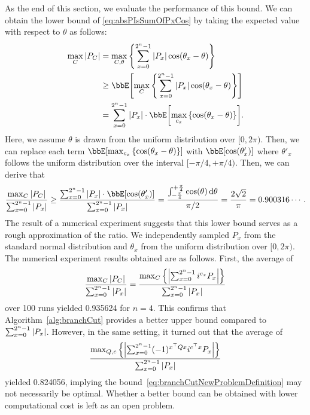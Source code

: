 \documentclass[aps,prx,onecolumn,superscriptaddress,nobibnotes,nofootinbib]{revtex4-2}
\begin{document}
As the end of this section, we evaluate the performance of this bound.
We can obtain the lower bound of \eqref{eq:absPIsSumOfPxCos} by taking the expected value with respect to $\theta$ as follows:
\begin{align*}
  \max_{C} \abs{P_C}
   & = \max_{C, \theta} \qty{\sum_{x=0}^{2^n-1} \abs{P_x} \cos(\theta_x -\theta)}             \\
   & \ge \bbE \qty[\max_{C} \qty{\sum_{x=0}^{2^n-1} \abs{P_x} \cos(\theta_x -\theta)}]        \\
   & = \sum_{x=0}^{2^n-1} \abs{P_x} \cdot \bbE \qty[\max_{c_x} \qty{\cos(\theta_x -\theta)}].
\end{align*}
Here, we assume $\theta$ is drawn from the uniform distribution over $[0, 2 \pi)$. Then, we can replace each term $\bbE \qty[\max_{c_x} \qty{\cos(\theta_x -\theta)}]$ with $\bbE\qty[\cos(\theta'_x)]$
where $\theta'_x$ follows the uniform distribution over the interval $[-\pi/4, +\pi/4)$.
Then, we can derive that
\begin{equation*}
  \frac{\max_{C} \abs{P_C}}{\sum_{x=0}^{2^n-1} \abs{P_x}}
  \ge
  \frac{\sum_{x=0}^{2^n-1} \abs{P_x} \cdot \bbE\qty[\cos(\theta'_x)]}{\sum_{x=0}^{2^n-1} \abs{P_x}}
  =\frac{\int_{-\frac{\pi}{4}}^{+\frac{\pi}{4}} \cos(\theta) \dd{\theta}}{\pi/2}
  = \frac{2\sqrt{2}}{\pi}=0.900316\cdots.
\end{equation*}
The result of a numerical experiment suggests that this lower bound serves as a rough approximation of the ratio.
We independently sampled $P_x$ from the standard normal distribution and $\theta_x$ from the uniform distribution over $[0,2\pi)$.
The numerical experiment results obtained are as follows.
First, the average of
\begin{equation*}
  \frac{\max_{C} \abs{P_C}}{\sum_{x=0}^{2^n-1} \abs{P_x}}
  = \frac{\max_{C} \qty{ \abs{\sum_{x=0}^{2^n-1} i^{c_x} P_x} }}{\sum_{x=0}^{2^n-1} \abs{P_x}}
\end{equation*}
over 100 runs yielded 0.935624 for $n=4$.
This confirms that Algorithm~\ref{alg:branchCut} provides
a better upper bound compared to $\sum_{x=0}^{2^n-1} \abs{P_x}$.
However, in the same setting, it turned out that the average of
\begin{equation*}
  \frac{\max_{Q,c} \qty{ \abs{\sum_{x=0}^{2^n-1} (-1)^{x^\top Q x} i^{c^\top x} P_x} }}{\sum_{x=0}^{2^n-1} \abs{P_x}}
\end{equation*}
yielded 0.824056, implying the
bound~\eqref{eq:branchCutNewProblemDefinition}
may not necessarily be optimal.
Whether a better bound can be obtained
with lower computational cost is
left as an open problem.
\end{document}
